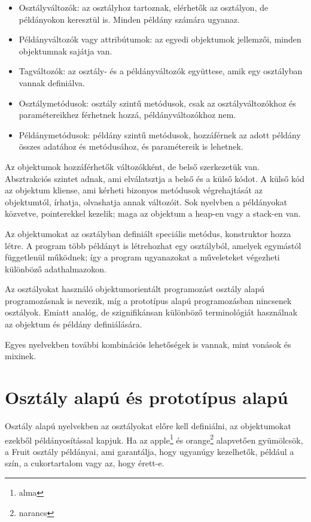 \documentclass[a4paper,12pt,twoside]{report}
\theoremstyle{definition}
\begin{document}
	\begin{itemize}
	\item Osztályváltozók: az osztályhoz tartoznak, elérhetők az osztályon, de példányokon keresztül is. Minden példány számára ugyanaz.
	\item Példányváltozók vagy attribútumok: az egyedi objektumok jellemzői, minden objektumnak sajátja van.
	\item Tagváltozók: az osztály- és a példányváltozók együttese, amik egy osztályban vannak definiálva.
	\item Osztálymetódusok: osztály szintű metódusok, csak az osztályváltozókhoz és paramétereikhez férhetnek hozzá, példányváltozókhoz nem.
	\item Példánymetódusok: példány szintű metódusok, hozzáférnek az adott példány összes adatához és metódusához, és paramétereik is lehetnek.
	\end{itemize}

	Az objektumok hozzáférhetők változókként, de belső szerkezetük van. Absztrakciós szintet adnak, ami elválatsztja a belső és a külső kódot. A külső kód az objektum kliense, ami kérheti bizonyos metódusok végrehajtását az objektumtól, írhatja, olvashatja annak változóit. Sok nyelvben a példányokat közvetve, pointerekkel kezelik; maga az objektum a heap-en vagy a stack-en van.
	
	Az objektumokat az osztályban definiált speciális metódus, konstruktor hozza létre. A program több példányt is létrehozhat egy osztályból, amelyek egymástól függetlenül működnek; így a program ugyanazokat a műveleteket végezheti különböző adathalmazokon.
	
	Az osztályokat használó objektumorientált programozást osztály alapú programozásnak is nevezik, míg a prototípus alapú programozásban nincsenek osztályok. Emiatt analóg, de szignifikánsan különböző terminológiát használnak az objektum és példány definiálására.
	
	Egyes nyelvekben további kombinációs lehetőségek is vannak, mint vonások és mixinek.
	
	\section{Osztály alapú és prototípus alapú}
	Osztály alapú nyelvekben az osztályokat előre kell definiálni, az objektumokat ezekből példányosítással kapjuk. Ha az apple\footnote{alma} és orange\footnote{narancs} alapvetően gyümölcsök, a Fruit osztály példányai, ami garantálja, hogy ugyanúgy kezelhetők, például a szín, a cukortartalom vagy az, hogy érett-e.
	
\end{document}
